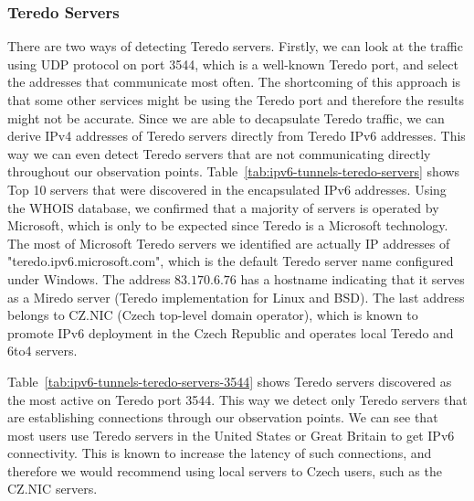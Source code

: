 \subsubsection{Teredo Servers}
There are two ways of detecting Teredo servers. Firstly, we can look at the traffic using UDP protocol on port 3544, which is a well-known Teredo port, and select the addresses that communicate most often. The shortcoming of this approach is that some other services might be using the Teredo port and therefore the results might not be accurate. Since we are able to decapsulate Teredo traffic, we can derive IPv4 addresses of Teredo servers directly from Teredo IPv6 addresses. This way we can even detect Teredo servers that are not communicating directly throughout our observation points. Table~\ref{tab:ipv6-tunnels-teredo-servers} shows Top 10 servers that were discovered in the encapsulated IPv6 addresses. Using the WHOIS database, we confirmed that a majority of servers is operated by Microsoft, which is only to be expected since Teredo is a Microsoft technology. The most of Microsoft Teredo servers we identified are actually IP addresses of "teredo.ipv6.microsoft.com", which is the default Teredo server name configured under Windows. The address $83.170.6.76$ has a hostname indicating that it serves as a Miredo server (Teredo implementation for Linux and BSD). The last address belongs to CZ.NIC (Czech top-level domain operator), which is known to promote IPv6 deployment in the Czech Republic and operates local Teredo and 6to4 servers.

Table~\ref{tab:ipv6-tunnels-teredo-servers-3544} shows Teredo servers discovered as the most active on Teredo port 3544. This way we detect only Teredo servers that are establishing connections through our observation points. We can see that most users use Teredo servers in the United States or Great Britain to get IPv6 connectivity. This is known to increase the latency of such connections, and therefore we would recommend using local servers to Czech users, such as the CZ.NIC servers.


